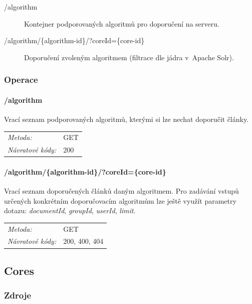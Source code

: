 \documentclass[thesis=M,czech]{FITthesis}[2014/05/07]
\begin{document}
\begin{description}
	\item[/algorithm] Kontejner podporovaných algoritmů pro doporučení na serveru.
	\item[/algorithm/\{algorithm-id\}/?coreId=\{core-id\}] Doporučení zvoleným algoritmem (filtrace dle jádra v~Apache Solr).
\end{description}

\subsubsection{Operace}

\paragraph*{/algorithm}

Vrací seznam podporovaných algoritmů, kterými si lze nechat doporučit články.

\begin{center}
 	\begin{tabular}{lp{10cm}}
 		\textit{Metoda:}		& GET			\tabularnewline 
 		\textit{Návratové kódy:}		& 200			\tabularnewline 		
 	\end{tabular}
\end{center} 	

\paragraph*{/algorithm/\{algorithm-id\}/?coreId=\{core-id\}}

Vrací seznam doporučených článků daným algoritmem. Pro zadávání vstupů určených konkrétním doporučovacím algoritmům lze ještě využít parametry dotazu: \emph{documentId}, \emph{groupId}, \emph{userId}, \emph{limit}.

\begin{center}
 	\begin{tabular}{lp{10cm}}
 		\textit{Metoda:}		& GET			\tabularnewline 
 		\textit{Návratové kódy:}		& 200, 400, 404			\tabularnewline 		
 	\end{tabular}
\end{center} 

\subsection{Cores}

\subsubsection{Zdroje}
\end{document}
